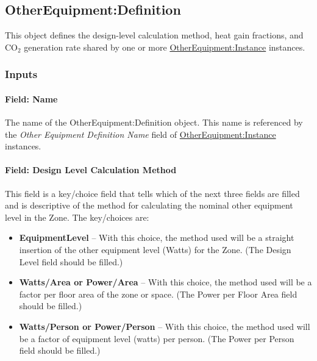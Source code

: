 \subsection{OtherEquipment:Definition}\label{otherequipmentdefinition}

This object defines the design-level calculation method, heat gain fractions, and CO\(_{2}\) generation rate shared by one or more \hyperref[otherequipmentinstance]{OtherEquipment:Instance} instances.

\subsubsection{Inputs}\label{inputs-8-otherequipmentdefinition}

\paragraph{Field: Name}\label{field-name-otherequipmentdefinition}

The name of the OtherEquipment:Definition object. This name is referenced by the \textit{Other Equipment Definition Name} field of \hyperref[otherequipmentinstance]{OtherEquipment:Instance} instances.

\paragraph{Field: Design Level Calculation Method}\label{field-design-level-calculation-method-5-other-definition}

This field is a key/choice field that tells which of the next three fields are filled and is descriptive of the method for calculating the nominal other equipment level in the Zone. The key/choices are:

\begin{itemize}
\tightlist
\item
  \textbf{EquipmentLevel} -- With this choice, the method used will be a straight insertion of the other equipment level (Watts) for the Zone. (The Design Level field should be filled.)
\item
  \textbf{Watts/Area or Power/Area} -- With this choice, the method used will be a factor per floor area of the zone or space. (The Power per Floor Area field should be filled.)
\item
  \textbf{Watts/Person or Power/Person} -- With this choice, the method used will be a factor of equipment level (watts) per person. (The Power per Person field should be filled.)
\end{itemize}

